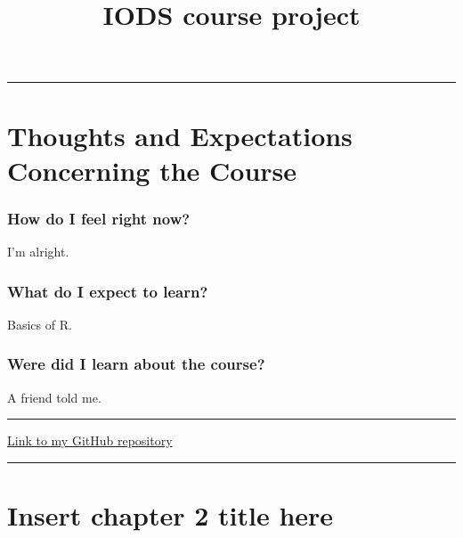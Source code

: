 \documentclass[]{article}
\title{IODS course project}
\author{}
\date{}
\begin{document}
\maketitle

{
\setcounter{tocdepth}{2}
\tableofcontents
}
\begin{center}\rule{0.5\linewidth}{\linethickness}\end{center}

\hypertarget{thoughts-and-expectations-concerning-the-course}{%
\section{\texorpdfstring{\textbf{Thoughts and Expectations Concerning
the
Course}}{Thoughts and Expectations Concerning the Course}}\label{thoughts-and-expectations-concerning-the-course}}

\hypertarget{how-do-i-feel-right-now}{%
\subsubsection{How do I feel right now?}\label{how-do-i-feel-right-now}}

I'm alright.

\hypertarget{what-do-i-expect-to-learn}{%
\subsubsection{What do I expect to
learn?}\label{what-do-i-expect-to-learn}}

Basics of R.

\hypertarget{were-did-i-learn-about-the-course}{%
\subsubsection{Were did I learn about the
course?}\label{were-did-i-learn-about-the-course}}

A friend told me.

\begin{center}\rule{0.5\linewidth}{\linethickness}\end{center}

\href{https://github.com/ohwhalme/IODS-project}{Link to my GitHub
repository}

\begin{center}\rule{0.5\linewidth}{\linethickness}\end{center}

\hypertarget{insert-chapter-2-title-here}{%
\section{Insert chapter 2 title
here}\label{insert-chapter-2-title-here}}
\end{document}
